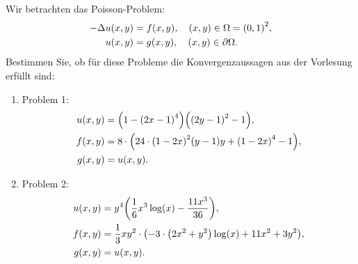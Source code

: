 \documentclass{exercise}
\begin{document}
    \begin{problem}
        Wir betrachten das Poisson-Problem:
        \begin{align*}
            -\Delta u\parentheses*{x, y} &= f\parentheses*{x, y}, \quad \parentheses*{x, y} \in \Omega = \parentheses*{0, 1}^2,\\
            u\parentheses*{x, y} &= g\parentheses*{x, y}, \quad \parentheses*{x, y} \in \partial\Omega.
        \end{align*}
        Bestimmen Sie, ob für diese Probleme die Konvergenzaussagen aus der Vorlesung erfüllt sind:
        \begin{enumerate}
            \item Problem 1:
            \begin{align*}
                u\parentheses*{x, y} &= \parentheses*{1 - \parentheses*{2x - 1}^4}\parentheses*{\parentheses*{2y - 1}^2 - 1},\\
                f\parentheses*{x, y} &= 8 \cdot \parentheses*{24 \cdot \parentheses*{1 - 2x}^2\parentheses*{y - 1}y + \parentheses*{1 - 2x}^4 - 1},\\
                g\parentheses*{x, y} &= u\parentheses*{x, y}.
            \end{align*}
            \item Problem 2:
            \begin{align*}
                u\parentheses*{x, y} &= y^4\parentheses*{\frac{1}{6}x^3\log\parentheses*{x} - \frac{11x^3}{36}},\\
                f\parentheses*{x, y} &= \frac{1}{3}xy^2 \cdot \parentheses*{-3 \cdot \parentheses*{2x^2 + y^2}\log\parentheses*{x} + 11x^2 + 3y^2},\\
                g\parentheses*{x, y} &= u\parentheses*{x, y}.
            \end{align*}
        \end{enumerate}
    \end{problem}
    
\end{document}
